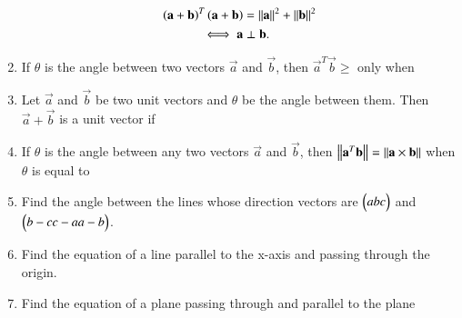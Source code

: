 \begin{enumerate}[label=\arabic*.,ref=\thesubsection.\theenumi]
\begin{align}
\left(\mathbf{a}+\mathbf{b}\right)^T\left(\mathbf{a}+\mathbf{b}\right) &= \left\lVert\mathbf{a}\right\rVert^2+\left\lVert\mathbf{b}\right\rVert^2
\\
\iff \mathbf{a}&\perp\mathbf{b}.
\end{align}
\item If $\theta$ is the angle between two vectors $\vec{a}$ and $\vec{b}$, then $\vec{a}^T\vec{b} \ge $ only when 
\begin{enumerate}[itemsep = 2pt]
\end{enumerate}
\item Let $\vec{a}$ and $\vec{b}$ be two unit vectors and $\theta$ be the angle between them.  Then $\vec{a}+\vec{b}$ is a unit vector if 
\begin{enumerate}[itemsep = 2pt]
\end{enumerate}
\item If $\theta$ is the angle between any two vectors $\vec{a}$ and $\vec{b}$, then 
$\left\lVert\mathbf{a}^T\mathbf{b}\right\rVert = \left\lVert\mathbf{a} \times \mathbf{b}\right\rVert$ when $\theta$ is equal to 
\begin{enumerate}[itemsep = 2pt]
\end{enumerate}
\item Find the angle between the lines whose direction vectors are $\begin{pmatrix}abc\end{pmatrix}$ and $\begin{pmatrix}b-cc-aa-b\end{pmatrix}$.
\item Find the equation of a line parallel to the x-axis and passing through the origin.
\item Find the equation of a plane passing through  and parallel to the plane 

\end{enumerate}
